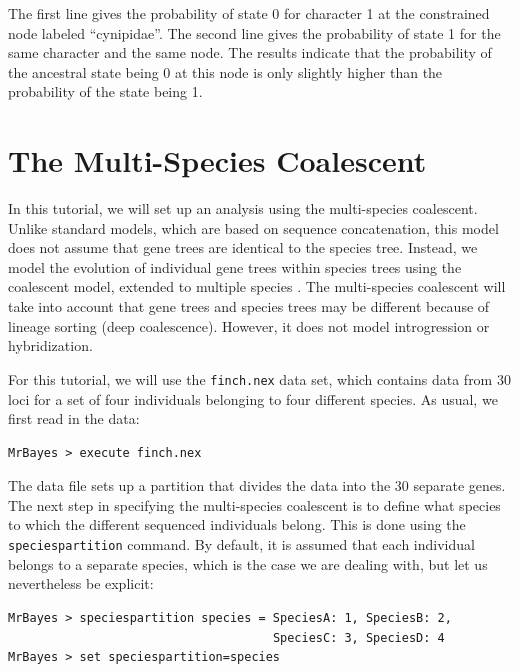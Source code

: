 \documentclass[12pt]{book}
\newcommand{\ttt}[1]{\texttt{#1} }
\begin{document}
The first line gives the probability of state 0 for character 1 at the constrained node labeled
``cynipidae''. The second line gives the probability of state 1 for the same character and the same
node. The results indicate that the probability of the ancestral state being 0 at this node is only
slightly higher than the probability of the state being 1.

\section{The Multi-Species Coalescent}

In this tutorial, we will set up an analysis using the multi-species coalescent. Unlike standard
models, which are based on sequence concatenation, this model does not assume that gene trees are
identical to the species tree. Instead, we model the evolution of individual gene trees within
species trees using the coalescent model, extended to multiple species \citep{liu07,edwards07}. The
multi-species coalescent will take into account that gene trees and species trees may be different
because of lineage sorting (deep coalescence). However, it does not model introgression or
hybridization.

For this tutorial, we will use the \ttt{finch.nex} data set, which contains data from 30 loci for a
set of four individuals belonging to four different species. As usual, we first read in the data:

\begin{verbatim}
MrBayes > execute finch.nex
\end{verbatim}

The data file sets up a partition that divides the data into the 30 separate genes. The next step
in specifying the multi-species coalescent is to define what species to which the different
sequenced individuals belong. This is done using the \ttt{speciespartition} command. By default, it
is assumed that each individual belongs to a separate species, which is the case we are dealing
with, but let us nevertheless be explicit:

\begin{singlespacing}
\begin{verbatim}
MrBayes > speciespartition species = SpeciesA: 1, SpeciesB: 2,
                                     SpeciesC: 3, SpeciesD: 4
MrBayes > set speciespartition=species
\end{verbatim}
\end{singlespacing}
\end{document}
